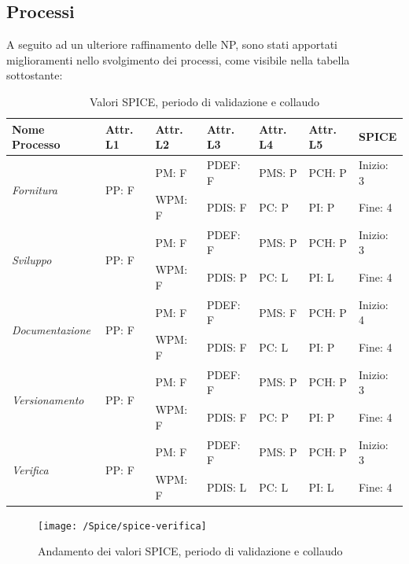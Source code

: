 \documentclass[openany,12pt,a4paper]{report}
\begin{document}
\subsection{Processi}

A seguito ad un ulteriore raffinamento delle NP, sono stati apportati miglioramenti nello svolgimento dei processi, come visibile nella tabella sottostante:

\begin{table}[h]
	\begin{center}
		\setlength\LTleft{-22mm}
		\begin{longtable}{|p{35mm}|p{20mm}|p{20mm}|p{20mm}|p{20mm}|p{20mm}|p{20mm}|}
			\hline
			\textbf{Nome Processo} & \textbf{Attr. L1} & \textbf{Attr. L2} & \textbf{Attr. L3} & \textbf{Attr. L4} & \textbf{Attr. L5} & \textbf{SPICE}\\
			\hline
			\multirow{2}{*}{\textit{Fornitura}} & \multirow{2}{*}{PP: F} & PM: F & PDEF: F & PMS: P & PCH: P & Inizio: 3\\  
			\cline{3-7}
			&          & WPM: F & PDIS: F & PC: P & PI: P & Fine: 4 \\ 
			\hline
			\multirow{2}{*}{\textit{Sviluppo}} & \multirow{2}{*}{PP: F} & PM: F & PDEF: F & PMS: P & PCH: P & Inizio: 3\\  \cline{3-7}
			&          & WPM: F & PDIS: P & PC: L & PI: L & Fine: 4\\
			\hline\multirow{2}{*}{\textit{Documentazione}} & \multirow{2}{*}{PP: F} & PM: F & PDEF: F & PMS: F & PCH: P & Inizio: 4\\  \cline{3-7}
			&          & WPM: F & PDIS: F & PC: L & PI: P & Fine: 4\\ 
			\hline\multirow{2}{*}{\textit{Versionamento}} & \multirow{2}{*}{PP: F} & PM: F & PDEF: F & PMS: P & PCH: P & Inizio: 3\\  \cline{3-7}
			&          & WPM: F & PDIS: F & PC: P & PI: P & Fine: 4\\ 
			\hline\multirow{2}{*}{\textit{Verifica}} & \multirow{2}{*}{PP: F} & PM: F & PDEF: F & PMS: P & PCH: P & Inizio: 3\\  \cline{3-7}
			&          & WPM: F & PDIS: L & PC: L & PI: L & Fine: 4\\ 
			\hline       
		\end{longtable}
	\end{center}
	\caption{Valori SPICE, periodo di validazione e collaudo} 
\end{table}

\begin{figure}[H]
	\texttt{[image: /Spice/spice-verifica]}
	\centering
	\caption{Andamento dei valori SPICE, periodo di validazione e collaudo}
\end{figure}
\end{document}
